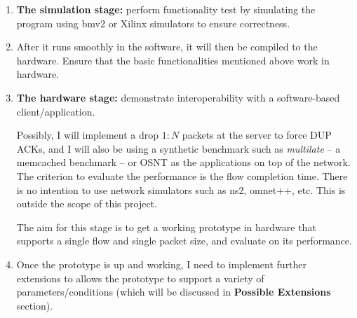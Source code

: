 \begin{enumerate}
\begin{itemize}
	\end{itemize}
	
	\item \textbf{The simulation stage:} perform functionality test by simulating the program using bmv2 or Xilinx simulators to ensure correctness. 
	
	\item After it runs smoothly in the software, it will then be compiled to the hardware. Ensure that the basic functionalities mentioned above work in hardware.
	
	\item \textbf{The hardware stage:} demonstrate interoperability with a software-based client/application.
	
	Possibly, I will implement a drop $1:N$ packets at the server to force DUP ACKs, and I will also be using a synthetic benchmark such as \emph{multilate} \cite{multilate} -- a memcached benchmark -- or OSNT \cite{OSNT} as the applications on top of the network. The criterion to evaluate the performance is the flow completion time. There is no intention to use network simulators such as ns2, omnet++, etc. This is outside the scope of this project.
	
	The aim for this stage is to get a working prototype in hardware that supports a single flow and single packet size, and evaluate on its performance.
	
	\item Once the prototype is up and working, I need to implement further extensions to allows the prototype to support a variety of parameters/conditions (which will be discussed in \textbf{Possible Extensions} section).
		
\end{enumerate}
